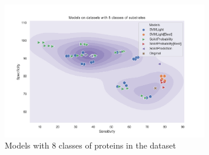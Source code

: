 \begin{figure}
    \begin{small}
        \begin{center}
            \includegraphics[width=0.8\textwidth]{figures/fig81}
        \end{center}
        \caption{Models with 8 classes of proteins in the dataset}
        \label{fig:figure}
    \end{small}
\end{figure}




